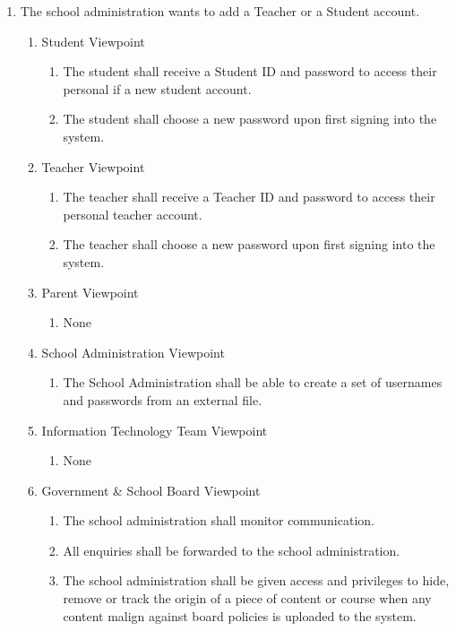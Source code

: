 \documentclass[]{article}
\begin{document}
\begin{enumerate}[{BE}1.]
	\item The school administration wants to add a Teacher or a Student account.
	\begin{enumerate}[{VP1}.1]
		\item Student Viewpoint
			\begin{enumerate}
				\item The student shall receive a Student ID and password to access their
personal if a new student account.
				\item The student shall choose a new password upon first signing into the
system.
			\end{enumerate}
		\item Teacher Viewpoint
			\begin{enumerate}
				\item The teacher shall receive a Teacher ID and password to access their
personal teacher account.
				\item The teacher shall choose a new password upon first signing into the
system.
			\end{enumerate}
		\item Parent Viewpoint
			\begin{enumerate}
				\item None
			\end{enumerate}
		\item School Administration Viewpoint
			\begin{enumerate}
				\item The School Administration shall be able to create a set of usernames
and passwords from an external file.
			\end{enumerate}
		\item Information Technology Team Viewpoint
			\begin{enumerate}
				\item None
			\end{enumerate}
		\item Government \& School Board Viewpoint
			\begin{enumerate}
				\item The school administration shall monitor communication. 
				\item All enquiries shall be
forwarded to the school administration.
				\item The school
administration shall be given access and privileges to hide, remove or track the
origin of a piece of content or course when any content malign against board 
policies is uploaded to the system.
			\end{enumerate}
	\end{enumerate}


\end{enumerate}
\end{document}
